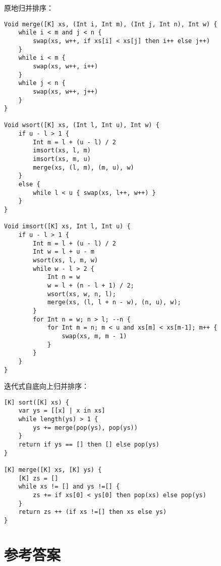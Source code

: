 \documentclass[b5paper]{ctexart}
\begin{document}
原地归并排序：

\begin{lstlisting}[language = Bourbaki]
Void merge([K] xs, (Int i, Int m), (Int j, Int n), Int w) {
    while i < m and j < n {
        swap(xs, w++, if xs[i] < xs[j] then i++ else j++)
    }
    while i < m {
        swap(xs, w++, i++)
    }
    while j < n {
        swap(xs, w++, j++)
    }
}

Void wsort([K] xs, (Int l, Int u), Int w) {
    if u - l > 1 {
        Int m = l + (u - l) / 2
        imsort(xs, l, m)
        imsort(xs, m, u)
        merge(xs, (l, m), (m, u), w)
    }
    else {
        while l < u { swap(xs, l++, w++) }
    }
}

Void imsort([K] xs, Int l, Int u) {
    if u - l > 1 {
        Int m = l + (u - l) / 2
        Int w = l + u - m
        wsort(xs, l, m, w)
        while w - l > 2 {
            Int n = w
            w = l + (n - l + 1) / 2;
            wsort(xs, w, n, l);
            merge(xs, (l, l + n - w), (n, u), w);
        }
        for Int n = w; n > l; --n {
            for Int m = n; m < u and xs[m] < xs[m-1]; m++ {
                swap(xs, m, m - 1)
            }
        }
    }
}
\end{lstlisting}

迭代式自底向上归并排序：

\begin{lstlisting}[language = Bourbaki]
[K] sort([K] xs) {
    var ys = [[x] | x in xs]
    while length(ys) > 1 {
        ys += merge(pop(ys), pop(ys))
    }
    return if ys == [] then [] else pop(ys)
}

[K] merge([K] xs, [K] ys) {
    [K] zs = []
    while xs != [] and ys !=[] {
        zs += if xs[0] < ys[0] then pop(xs) else pop(ys)
    }
    return zs ++ (if xs !=[] then xs else ys)
}
\end{lstlisting}

\ifx\wholebook\relax\else
\section{参考答案}
\shipoutAnswer
\end{document}
